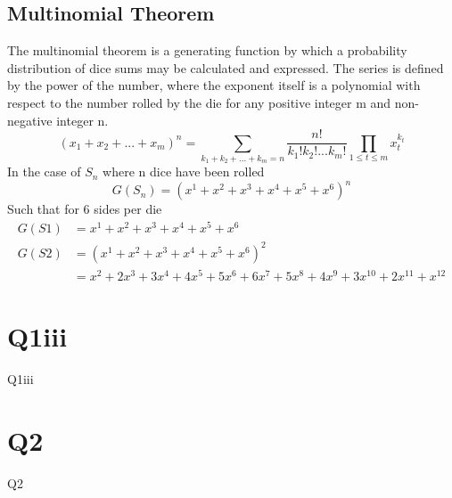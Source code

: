 \documentclass[12pt]{article}
\begin{document}
\subsection{Multinomial Theorem}
The multinomial theorem is a generating function by which a probability distribution of dice sums may be calculated and expressed. The series is defined by the power of the number, where the exponent itself is a polynomial with respect to the number rolled by the die for any positive integer m and non-negative integer n.
$$(x_1+x_2+...+x_m)^n=\sum_{k_1+k_2+...+k_m=n}{}\frac{n!}{k_1!k_2!...k_m!}\prod_{1\leq t\leq m}^{}x_{t}^{k_t}$$
In the case of $S_n$ where n dice have been rolled
$$G(S_n)=(x^1+x^2+x^3+x^4+x^5+x^6)^n$$
Such that for 6 sides per die
\begin{align*}
G(S1)&=x^1+x^2+x^3+x^4+x^5+x^6\\
G(S2)&=(x^1+x^2+x^3+x^4+x^5+x^6)^2\\
&=x^2+2x^3+3x^4+4x^5+5x^6+6x^7+5x^8+4x^9+3x^{10}+2x^{11}+x^{12}
\end{align*}

\clearpage

\section{Q1iii}
Q1iii
\clearpage

\section{Q2}
Q2
\clearpage
\end{document}
